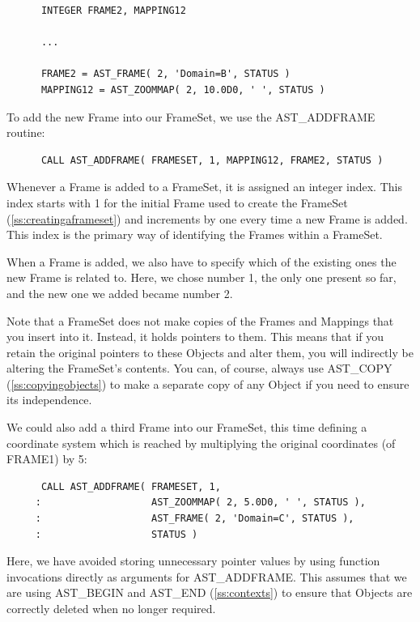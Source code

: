 \documentclass[twoside,11pt]{article}
\newcommand{\htmlref}[2]{#1}
\newcommand{\secref}[1]{\S\ref{#1}}
\renewcommand{\secref}[1]{\ref{#1}}
\begin{document}
\small
\begin{verbatim}
      INTEGER FRAME2, MAPPING12

      ...

      FRAME2 = AST_FRAME( 2, 'Domain=B', STATUS )
      MAPPING12 = AST_ZOOMMAP( 2, 10.0D0, ' ', STATUS )
\end{verbatim}
\normalsize

To add the new Frame into our FrameSet, we use the \htmlref{AST\_ADDFRAME}{AST_ADDFRAME}
routine:

\small
\begin{verbatim}
      CALL AST_ADDFRAME( FRAMESET, 1, MAPPING12, FRAME2, STATUS )
\end{verbatim}
\normalsize

Whenever a Frame is added to a FrameSet, it is assigned an integer
index. This index starts with 1 for the initial Frame used to create
the FrameSet (\secref{ss:creatingaframeset}) and increments by one
every time a new Frame is added. This index is the primary way of
identifying the Frames within a FrameSet.

When a Frame is added, we also have to specify which of the existing
ones the new Frame is related to. Here, we chose number 1, the only
one present so far, and the new one we added became number 2.

Note that a FrameSet does not make copies of the Frames and Mappings
that you insert into it. Instead, it holds pointers to them. This
means that if you retain the original pointers to these Objects and
alter them, you will indirectly be altering the FrameSet's
contents. You can, of course, always use \htmlref{AST\_COPY}{AST_COPY}
(\secref{ss:copyingobjects}) to make a separate copy of any \htmlref{Object}{Object} if
you need to ensure its independence.

We could also add a third Frame into our FrameSet, this time defining
a coordinate system which is reached by multiplying the original
coordinates (of FRAME1) by 5:

\small
\begin{verbatim}
      CALL AST_ADDFRAME( FRAMESET, 1,
     :                   AST_ZOOMMAP( 2, 5.0D0, ' ', STATUS ),
     :                   AST_FRAME( 2, 'Domain=C', STATUS ),
     :                   STATUS )
\end{verbatim}
\normalsize

Here, we have avoided storing unnecessary pointer values by using
function invocations directly as arguments for AST\_ADDFRAME. This
assumes that we are using \htmlref{AST\_BEGIN}{AST_BEGIN} and \htmlref{AST\_END}{AST_END}
(\secref{ss:contexts}) to ensure that Objects are correctly deleted
when no longer required.
\end{document}

